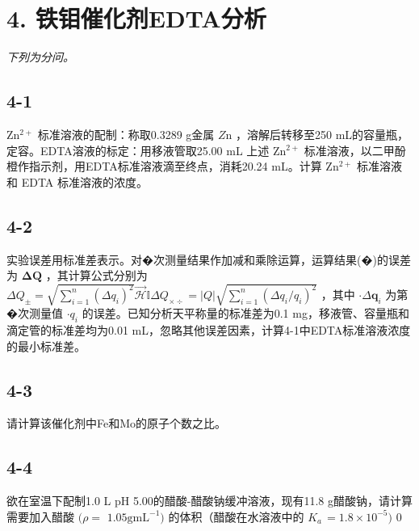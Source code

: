 \section*{4. 铁钼催化剂EDTA分析}
\textit{下列为分问。}

\subsection*{4-1}
$\mathrm { Z n ^ { 2 + } }$ 标准溶液的配制：称取0.3289 g⾦属 $Z \mathrm { n }$ ，溶解后转移⾄250 mL的容量瓶，定容。EDTA溶液的标定：⽤移液管取25.00 mL 上述 $\mathrm { Z n ^ { 2 + } }$ 标准溶液，以⼆甲酚橙作指⽰剂，⽤EDTA标准溶液滴⾄终点，消耗20.24 mL。计算 $\mathrm { Z n ^ { 2 + } }$ 标准溶液和 EDTA 标准溶液的浓度。

\subsection*{4-2}
实验误差⽤标准差表⽰。对�次测量结果作加减和乘除运算，运算结果(�)的误差为 ${ \boldsymbol { \Delta Q } }$ ，其计算公式分别为 $\Delta Q _ { \pm } = \sqrt { \sum _ { i = 1 } ^ { n } ( \Delta q _ { i } ) ^ { 2 } } \mathcal { \vec { H } } \mathbb { I } \Delta Q _ { \times \div } = | Q | \sqrt { \sum _ { i = 1 } ^ { n } ( \Delta q _ { i } / q _ { i } ) ^ { 2 } }$ ，其中 $\boldsymbol { \cdot } \Delta \boldsymbol { q } _ { i }$ 为第�次测量值 $\cdot q _ { i }$ 的误差。已知分析天平称量的标准差为0.1 mg，移液管、容量瓶和滴定管的标准差均为0.01 mL，忽略其他误差因素，计算4-1中EDTA标准溶液浓度的最⼩标准差。

\subsection*{4-3}
请计算该催化剂中Fe和Mo的原⼦个数之⽐。

\subsection*{4-4}
欲在室温下配制1.0 L pH 5.00的醋酸-醋酸钠缓冲溶液，现有11.8 g醋酸钠，请计算需要加⼊醋酸 $( \rho =$ $1 . 0 5 \mathrm { g } \mathrm { m L } ^ { - 1 } )$ 的体积（醋酸在⽔溶液中的 $K _ { a } _ { \mathrm { ~ } } = 1 . 8 \times 1 0 ^ { - 5 } )$ 0
